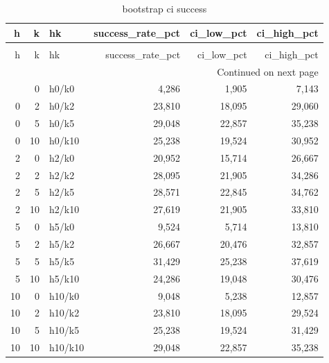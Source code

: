 \begin{longtable}{rrlrrr}
\caption{bootstrap ci success} \label{tab:bootstrap_ci_success} \\
\toprule
h & k & hk & success\_rate\_pct & ci\_low\_pct & ci\_high\_pct \\
\midrule
\endfirsthead
\caption[]{bootstrap ci success} \\
\toprule
h & k & hk & success\_rate\_pct & ci\_low\_pct & ci\_high\_pct \\
\midrule
\endhead
\midrule
\multicolumn{6}{r}{Continued on next page} \\
\midrule
\endfoot
\bottomrule
\endlastfoot
0 & 0 & h0/k0 & 4,286 & 1,905 & 7,143 \\
0 & 2 & h0/k2 & 23,810 & 18,095 & 29,060 \\
0 & 5 & h0/k5 & 29,048 & 22,857 & 35,238 \\
0 & 10 & h0/k10 & 25,238 & 19,524 & 30,952 \\
2 & 0 & h2/k0 & 20,952 & 15,714 & 26,667 \\
2 & 2 & h2/k2 & 28,095 & 21,905 & 34,286 \\
2 & 5 & h2/k5 & 28,571 & 22,845 & 34,762 \\
2 & 10 & h2/k10 & 27,619 & 21,905 & 33,810 \\
5 & 0 & h5/k0 & 9,524 & 5,714 & 13,810 \\
5 & 2 & h5/k2 & 26,667 & 20,476 & 32,857 \\
5 & 5 & h5/k5 & 31,429 & 25,238 & 37,619 \\
5 & 10 & h5/k10 & 24,286 & 19,048 & 30,476 \\
10 & 0 & h10/k0 & 9,048 & 5,238 & 12,857 \\
10 & 2 & h10/k2 & 23,810 & 18,095 & 29,524 \\
10 & 5 & h10/k5 & 25,238 & 19,524 & 31,429 \\
10 & 10 & h10/k10 & 29,048 & 22,857 & 35,238 \\
\end{longtable}
